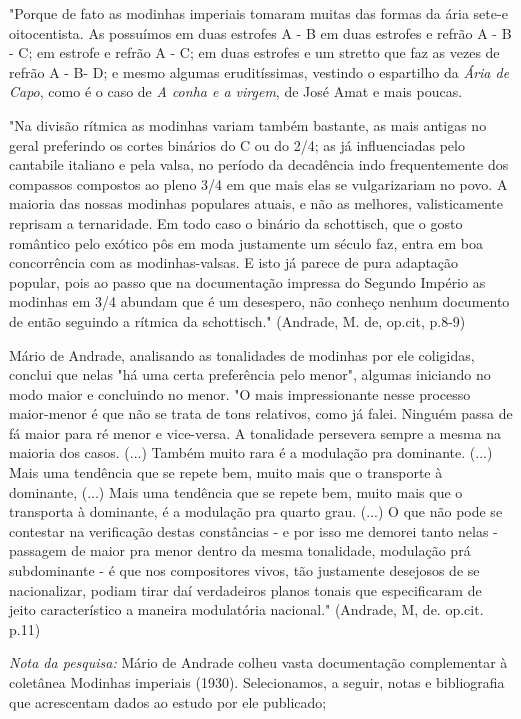 "Porque de fato as modinhas imperiais tomaram muitas das formas da ária
sete-e oitocentista. As possuímos em duas estrofes A - B em duas
estrofes e refrão A - B - C; em estrofe e refrão A - C; em duas estrofes
e um stretto que faz as vezes de refrão A - B- D; e mesmo algumas
eruditíssimas, vestindo o espartilho da \emph{Ária de Capo}, como é o
caso de \emph{A conha e a virgem}, de José Amat e mais poucas.

"Na divisão rítmica as modinhas variam também bastante, as mais antigas
no geral preferindo os cortes binários do C ou do 2/4; as já
influenciadas pelo cantabile italiano e pela valsa, no período da
decadência indo frequentemente dos compassos compostos ao pleno 3/4 em
que mais elas se vulgarizariam no povo. A maioria das nossas modinhas
populares atuais, e não as melhores, valisticamente reprisam a
ternaridade. Em todo caso o binário da schottisch, que o gosto romântico
pelo exótico pôs em moda justamente um século faz, entra em boa
concorrência com as modinhas-valsas. E isto já parece de pura adaptação
popular, pois ao passo que na documentação impressa do Segundo Império
as modinhas em 3/4 abundam que é um desespero, não conheço nenhum
documento de então seguindo a rítmica da schottisch." (Andrade, M. de,
op.cit, p.8-9)

Mário de Andrade, analisando as tonalidades de modinhas por ele
coligidas, conclui que nelas "há uma certa preferência pelo menor",
algumas iniciando no modo maior e concluindo no menor. "O mais
impressionante nesse processo maior-menor é que não se trata de tons
relativos, como já falei. Ninguém passa de fá maior para ré menor e
vice-versa. A tonalidade persevera sempre a mesma na maioria dos casos.
(...) Também muito rara é a modulação pra dominante. (...) Mais uma
tendência que se repete bem, muito mais que o transporte à dominante,
(...) Mais uma tendência que se repete bem, muito mais que o transporta
à dominante, é a modulação pra quarto grau. (...) O que não pode se
contestar na verificação destas constâncias - e por isso me demorei
tanto nelas - passagem de maior pra menor dentro da mesma tonalidade,
modulação prá subdominante - é que nos compositores vivos, tão
justamente desejosos de se nacionalizar, podiam tirar daí verdadeiros
planos tonais que especificaram de jeito característico a maneira
modulatória nacional." (Andrade, M, de. op.cit. p.11)

\emph{Nota da pesquisa:} Mário de Andrade colheu vasta documentação
complementar à coletânea Modinhas imperiais (1930). Selecionamos, a
seguir, notas e bibliografia que acrescentam dados ao estudo por ele
publicado;

